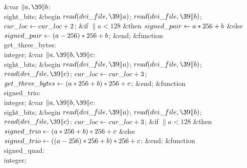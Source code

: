 \4\&{var} $\|a,\39\|b$: \\{eight\_bits};\2\6
\&{begin} $\\{read}(\\{dvi\_file},\39\|a)$;\5
$\\{read}(\\{dvi\_file},\39\|b)$;\5
$\\{cur\_loc}\gets\\{cur\_loc}+2$;\6
\&{if} $\|a<128$ \1\&{then}\5
$\\{signed\_pair}\gets\hbox{$a$}\ast256+\hbox{$b$}$\6
\4\&{else} $\\{signed\_pair}\gets(\hbox{$a$}-256)\ast256+\hbox{$b$}$;\2\6
\&{end};\7
\4\&{function}\1\  \\{get\_three\_bytes}: \\{integer};\6
\4\&{var} $\|a,\39\|b,\39\|c$: \\{eight\_bits};\2\6
\&{begin} $\\{read}(\\{dvi\_file},\39\|a)$;\5
$\\{read}(\\{dvi\_file},\39\|b)$;\5
$\\{read}(\\{dvi\_file},\39\|c)$;\5
$\\{cur\_loc}\gets\\{cur\_loc}+3$;\5
$\\{get\_three\_bytes}\gets(\hbox{$a$}\ast256+\hbox{$b$})\ast256+\hbox{$c$}$;\6
\&{end};\7
\4\&{function}\1\  \\{signed\_trio}: \\{integer};\6
\4\&{var} $\|a,\39\|b,\39\|c$: \\{eight\_bits};\2\6
\&{begin} $\\{read}(\\{dvi\_file},\39\|a)$;\5
$\\{read}(\\{dvi\_file},\39\|b)$;\5
$\\{read}(\\{dvi\_file},\39\|c)$;\5
$\\{cur\_loc}\gets\\{cur\_loc}+3$;\6
\&{if} $\|a<128$ \1\&{then}\5
$\\{signed\_trio}\gets(\hbox{$a$}\ast256+\hbox{$b$})\ast256+\hbox{$c$}$\6
\4\&{else} $\\{signed\_trio}\gets((\hbox{$a$}-256)\ast256+\hbox{$b$})\ast256+\hbox{$c$}$;\2\6
\&{end};\7
\4\&{function}\1\  \\{signed\_quad}: \\{integer};\6
